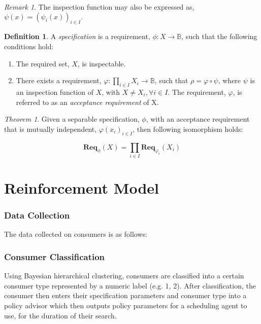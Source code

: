 \documentclass{article}
\theoremstyle{definition}
\newtheorem{definition}{Definition}[section]
\theoremstyle{remark}
\newtheorem*{remark}{Remark}
\newtheorem*{theorem}{Theorem}
\newcommand{\reqfunc}[2]{#1:#2\rightarrow\mathbb{B}}
\newcommand{\reqop}[2]{\mathbf{Req}_{#1}(#2)}
\begin{document}
		\begin{remark}
			The inspection function may also be expressed as, $\psi(x) = (\psi_{i}(x))_{i \in I}.$
		\end{remark}
		
		\begin{definition}
			A \emph{specification} is a requirement, $\reqfunc{\phi}{X}$, such that the following conditions
			hold:
			
			\begin{enumerate}
				\item   The required set, $X$, is inspectable.
				
				\item   There exists a requirement, $\reqfunc{\varphi}{\prod_{i \in I}{X_{i}}}$,
				such that $\rho = \varphi \circ \psi$, where $\psi$ is an inspection function of $X$,
				with $X \ne X_{i}, \forall i \in I$. The requirement, $\varphi$, is referred to as an
				\emph{acceptance requirement} of X.
			\end{enumerate}
			
		\end{definition}
		
		\begin{theorem}
			Given a separable specification, $\phi$, with an acceptance requirement that is mutually independent,
			$\varphi(x_i)_{i \in I}$, then following isomorphism holds:
			
			\[
			\reqop{\phi}{X} = \prod_{i \in I}\reqop{\varphi_{i}}{X_{i}}
			\]
		\end{theorem}
	

	
	\newpage
	
	\part{Reinforcement Model}

	\section{Data Collection}

	The data collected on consumers is as follows:
	\begin{table}

	\end{table}

	\section{Consumer Classification}
	Using Bayesian hierarchical clustering, consumers are classified into a certain consumer type represented by a
    numeric label (e.g. 1, 2). After classification, the consumer then enters their specification parameters and
    consumer type into a policy advisor which then outputs policy parameters for a scheduling agent to use, for
    the duration of their search.
	
\end{document}
